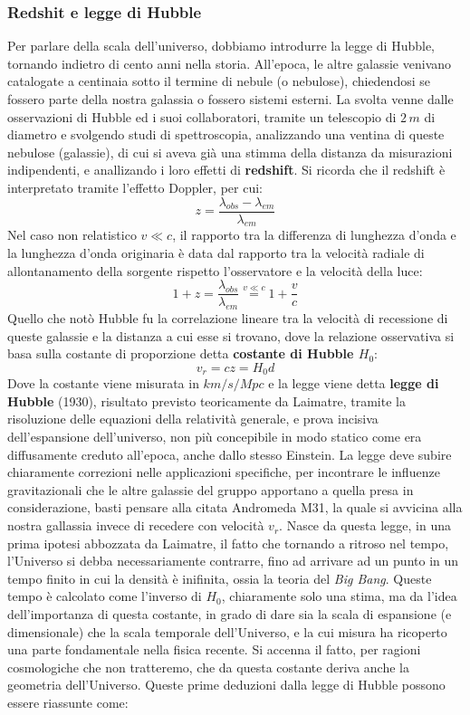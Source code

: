 \documentclass[a4paper,twoside,openany,notitlepage]{book}
\theoremstyle{definition}
\theoremstyle{plain}
\begin{document}
\subsubsection*{Redshit e legge di Hubble}
Per parlare della scala dell'universo, dobbiamo introdurre la legge di Hubble, tornando indietro di cento anni nella storia. All'epoca, le altre galassie venivano catalogate a centinaia sotto il termine di nebule (o nebulose), chiedendosi se fossero parte della nostra galassia o fossero sistemi esterni. La svolta venne dalle osservazioni di Hubble ed i suoi collaboratori, tramite un telescopio di $2\,m$ di diametro e svolgendo studi di spettroscopia, analizzando una ventina di queste nebulose (galassie), di cui si aveva già una stimma della distanza da misurazioni indipendenti, e anallizando i loro effetti di \textbf{redshift}. Si ricorda che il redshift è interpretato tramite l'effetto Doppler, per cui:
\begin{equation*}
	z=\frac{\lambda_{obs}-\lambda_{em}}{\lambda_{em}}
\end{equation*}
Nel caso non relatistico $v \ll c$, il rapporto tra la differenza di lunghezza d'onda e la lunghezza d'onda originaria è data dal rapporto tra la velocità radiale di allontanamento della sorgente rispetto l'osservatore e la velocità della luce:
\begin{equation*}
	1+z = \frac{\lambda_{obs}}{\lambda_{em}} \overset{v \ll c}{=} 1+\frac{v}{c}
\end{equation*}
Quello che notò Hubble fu la correlazione lineare tra la velocità di recessione di queste galassie e la distanza a cui esse si trovano, dove la relazione osservativa si basa sulla costante di proporzione detta \textbf{costante di Hubble $H_0$}:
\begin{equation}
	\label{eq:Hubble}
	v_r=cz=H_0d
\end{equation}
Dove la costante viene misurata in $km/s/Mpc$ e la legge viene detta \textbf{legge di Hubble} (1930), risultato previsto teoricamente da Laimatre, tramite la risoluzione delle equazioni della relatività generale, e prova incisiva dell'espansione dell'universo, non più concepibile in modo statico come era diffusamente creduto all'epoca, anche dallo stesso Einstein. La legge deve subire chiaramente correzioni nelle applicazioni specifiche, per incontrare le influenze gravitazionali che le altre galassie del gruppo apportano a quella presa in considerazione, basti pensare alla citata Andromeda M31, la quale si avvicina alla nostra gallassia invece di recedere con velocità $v_r$. Nasce da questa legge, in una prima ipotesi abbozzata da Laimatre, il fatto che tornando a ritroso nel tempo, l'Universo si debba necessariamente contrarre, fino ad arrivare ad un punto in un tempo finito in cui la densità è inifinita, ossia la teoria del \textit{Big Bang}. Queste tempo è calcolato come l'inverso di $H_0$, chiaramente solo una stima, ma da l'idea dell'importanza di questa costante, in grado di dare sia la scala di espansione (e dimensionale) che la scala temporale dell'Universo, e la cui misura ha ricoperto una parte fondamentale nella fisica recente. Si accenna il fatto, per ragioni cosmologiche che non tratteremo, che da questa costante deriva anche la geometria dell'Universo. Queste prime deduzioni dalla legge di Hubble possono essere riassunte come:
\end{document}
